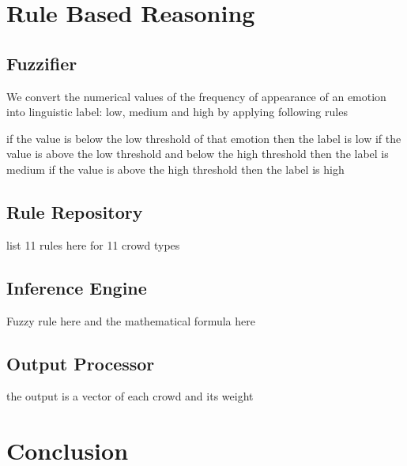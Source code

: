 \section{Rule Based Reasoning}

\subsection{Fuzzifier}
We convert the numerical values of the frequency of appearance of an emotion into linguistic label: low, medium and high by applying following rules

if the value is below the low threshold of that emotion then the label is low
if the value is above the low threshold and below the high threshold then the label is medium
if the value is above the high threshold then the label is high

\subsection{Rule Repository}

list 11 rules here for 11 crowd types

\subsection{Inference Engine}

Fuzzy rule here and the mathematical formula here

\subsection{Output Processor}

the output is a vector of each crowd and its weight

\section{Conclusion}